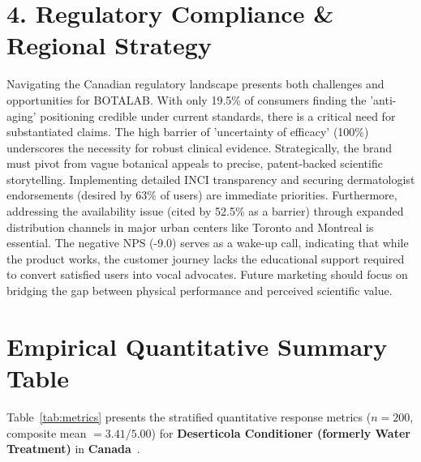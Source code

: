 \documentclass[10pt,twocolumn,a4paper]{article}
\begin{document}
\section{4. Regulatory Compliance \& Regional Strategy}
Navigating the Canadian regulatory landscape presents both challenges and opportunities for BOTALAB. With only 19.5\% of consumers finding the 'anti-aging' positioning credible under current standards, there is a critical need for substantiated claims. The high barrier of 'uncertainty of efficacy' (100\%) underscores the necessity for robust clinical evidence. Strategically, the brand must pivot from vague botanical appeals to precise, patent-backed scientific storytelling. Implementing detailed INCI transparency and securing dermatologist endorsements (desired by 63\% of users) are immediate priorities. Furthermore, addressing the availability issue (cited by 52.5\% as a barrier) through expanded distribution channels in major urban centers like Toronto and Montreal is essential. The negative NPS (-9.0) serves as a wake-up call, indicating that while the product works, the customer journey lacks the educational support required to convert satisfied users into vocal advocates. Future marketing should focus on bridging the gap between physical performance and perceived scientific value.


\section{Empirical Quantitative Summary Table}
Table~\ref{tab:metrics} presents the stratified quantitative response metrics ($n = 200$, composite mean $= 3.41/5.00$) for \textbf{Deserticola Conditioner (formerly Water Treatment)} in \textbf{Canada}~\cite{ref_kaggle_doi,ref_hf_doi}.
\end{document}
